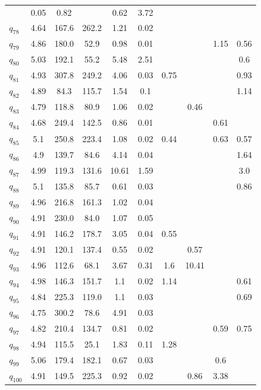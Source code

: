 \documentclass[11pt]{article}
\begin{document}
\begin{table}[htbp]
{\begin{tabular}{lccccccccc}
& 0.05 & 0.82 &   & 0.62 & 3.72 \\  $q_{78}$ & 4.64 & 167.6 & 262.2 & 1.21 & 0.02 &   &   &   &   \\  $q_{79}$ & 4.86 & 180.0 & 52.9 & 0.98 & 0.01 &   &   & 1.15 & 0.56 \\  $q_{80}$ & 5.03 & 192.1 & 55.2 & 5.48 & 2.51 &   &   &   & 0.6 \\  $q_{81}$ & 4.93 & 307.8 & 249.2 & 4.06 & 0.03 & 0.75 &   &   & 0.93 \\  $q_{82}$ & 4.89 & 84.3 & 115.7 & 1.54 & 0.1 &   &   &   & 1.14 \\  $q_{83}$ & 4.79 & 118.8 & 80.9 & 1.06 & 0.02 &   & 0.46 &   &   \\  $q_{84}$ & 4.68 & 249.4 & 142.5 & 0.86 & 0.01 &   &   & 0.61 &   \\  $q_{85}$ & 5.1 & 250.8 & 223.4 & 1.08 & 0.02 & 0.44 &   & 0.63 & 0.57 \\  $q_{86}$ & 4.9 & 139.7 & 84.6 & 4.14 & 0.04 &   &   &   & 1.64 \\  $q_{87}$ & 4.99 & 119.3 & 131.6 & 10.61 & 1.59 &   &   &   & 3.0 \\  $q_{88}$ & 5.1 & 135.8 & 85.7 & 0.61 & 0.03 &   &   &   & 0.86 \\  $q_{89}$ & 4.96 & 216.8 & 161.3 & 1.02 & 0.04 &   &   &   &   \\  $q_{90}$ & 4.91 & 230.0 & 84.0 & 1.07 & 0.05 &   &   &   &   \\  $q_{91}$ & 4.91 & 146.2 & 178.7 & 3.05 & 0.04 & 0.55 &   &   &   \\  $q_{92}$ & 4.91 & 120.1 & 137.4 & 0.55 & 0.02 &   & 0.57 &   &   \\  $q_{93}$ & 4.96 & 112.6 & 68.1 & 3.67 & 0.31 & 1.6 & 10.41 &   &   \\  $q_{94}$ & 4.98 & 146.3 & 151.7 & 1.1 & 0.02 & 1.14 &   &   & 0.61 \\  $q_{95}$ & 4.84 & 225.3 & 119.0 & 1.1 & 0.03 &   &   &   & 0.69 \\  $q_{96}$ & 4.75 & 300.2 & 78.6 & 4.91 & 0.03 &   &   &   &   \\  $q_{97}$ & 4.82 & 210.4 & 134.7 & 0.81 & 0.02 &   &   & 0.59 & 0.75 \\  $q_{98}$ & 4.94 & 115.5 & 25.1 & 1.83 & 0.11 & 1.28 &   &   &   \\  $q_{99}$ & 5.06 & 179.4 & 182.1 & 0.67 & 0.03 &   &   & 0.6 &   \\  $q_{100}$ & 4.91 & 149.5 & 225.3 & 0.92 & 0.02 &   & 0.86 & 3.38 &   
\end{tabular}
}
\end{table}
\end{document}
